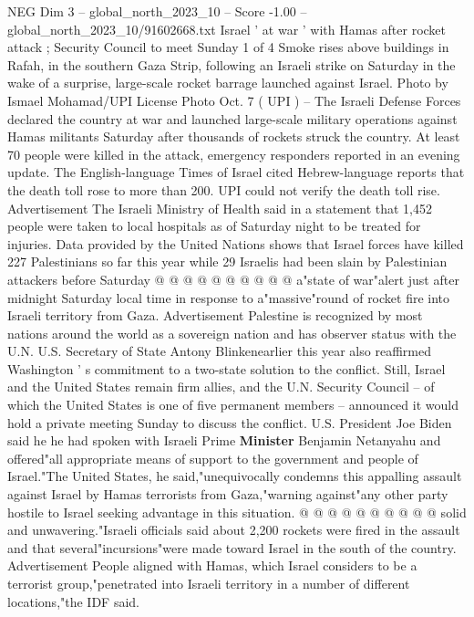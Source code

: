 \begin{textsample}{NEG Dim 3 – global\_north\_2023\_10 – Score -1.00 – global\_north\_2023\_10/91602668.txt}  \label{ex:f3_neg_252}
Israel ' at war ' with Hamas after rocket attack ; Security Council to meet Sunday 1 of 4 Smoke rises above buildings in Rafah, in the southern Gaza Strip, following an Israeli strike on Saturday in the wake of a surprise, large-scale rocket barrage launched against Israel.
Photo by Ismael Mohamad/UPI License Photo Oct. 7 ( UPI ) -- The Israeli Defense Forces declared the country at war and launched large-scale military operations against Hamas militants Saturday after thousands of rockets struck the country.
At least 70 people were killed in the attack, emergency responders reported in an evening update.
The English-language Times of Israel cited Hebrew-language reports that the death toll rose to more than 200.
UPI could not verify the death toll rise.
Advertisement The Israeli Ministry of Health said in a statement that 1,452 people were taken to local hospitals as of Saturday night to be treated for injuries.
Data provided by the United Nations shows that Israel forces have killed 227 Palestinians so far this year while 29 Israelis had been slain by Palestinian attackers before Saturday @ @ @ @ @ @ @ @ @ @ a"state of war"alert just after midnight Saturday local time in response to a"massive"round of rocket fire into Israeli territory from Gaza.
Advertisement Palestine is recognized by most nations around the world as a sovereign nation and has observer status with the U.N.
U.S.
Secretary of State Antony Blinkenearlier this year also reaffirmed Washington ' s commitment to a two-state solution to the conflict.
Still, Israel and the United States remain firm allies, and the U.N.
Security Council -- of which the United States is one of five permanent members -- announced it would hold a private meeting Sunday to discuss the conflict.
U.S.
President Joe Biden said he he had spoken with Israeli Prime \textbf{Minister} Benjamin Netanyahu and offered"all appropriate means of support to the government and people of Israel."The United States, he said,"unequivocally condemns this appalling assault against Israel by Hamas terrorists from Gaza,"warning against"any other party hostile to Israel seeking advantage in this situation. @ @ @ @ @ @ @ @ @ @ solid and unwavering."Israeli officials said about 2,200 rockets were fired in the assault and that several"incursions"were made toward Israel in the south of the country.
Advertisement People aligned with Hamas, which Israel considers to be a terrorist group,"penetrated into Israeli territory in a number of different locations,"the IDF said.

\end{textsample}

